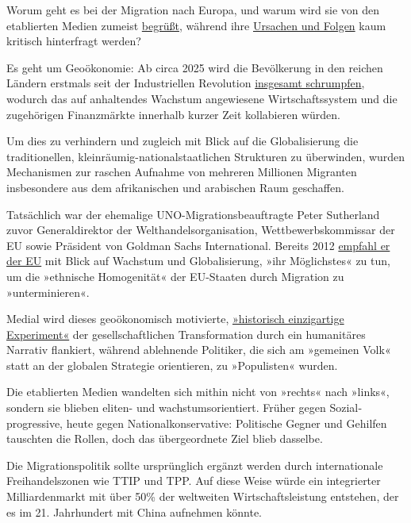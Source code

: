 Worum geht es bei der Migration nach Europa, und warum wird sie von den
etablierten Medien zumeist
\href{https://www.otto-brenner-stiftung.de/wissenschaftsportal/informationsseiten-zu-studien/studien-2017/die-fluechtlingskrise-in-den-medien/}{begrüßt},
während ihre
\href{https://www.heise.de/tp/features/Massenwanderungen-haben-sowohl-in-den-Herkunftslaendern-als-auch-den-Ziellaendern-der-Migranten-4205760.html?seite=all}{Ursachen
und Folgen} kaum kritisch hinterfragt werden?

Es geht um Geoökonomie: Ab circa 2025 wird die Bevölkerung in den
reichen Ländern erstmals seit der Industriellen Revolution
\href{https://econimica.blogspot.com/2019/07/2019-un-population-prospects-highlights.html}{insgesamt
schrumpfen}, wodurch das auf anhaltendes Wachstum angewiesene
Wirtschafts­system und die zugehörigen Finanzmärkte innerhalb kurzer
Zeit kollabieren würden.

Um dies zu verhindern und zugleich mit Blick auf die Globalisierung die
traditionellen, kleinräumig-national­­staatlichen Strukturen zu
überwinden, wurden Mechanismen zur raschen Aufnahme von mehreren
Millionen Migranten insbesondere aus dem afrikanischen und arabischen
Raum geschaffen.

Tatsächlich war der ehemalige UNO-Mi­gra­tions­beauftragte Peter
Sutherland zuvor Ge­ne­ral­di­rek­tor der Welt­handels­organisation,
Wett­be­werbs­kommissar der EU sowie Präsident von Goldman Sachs
Inter­na­tional. Bereits 2012
\href{https://de.wikipedia.org/wiki/Peter_Sutherland}{empfahl er der EU}
mit Blick auf Wachstum und Globalisierung, »ihr Möglichstes« zu tun, um
die »ethnische Homogenität« der EU-Staaten durch Migration zu
»unterminieren«.

Medial wird dieses geoökonomisch motivierte,
\href{https://www.youtube.com/watch?v=y9rVVYU-cS0\&t=1559}{»historisch
einzigartige Experiment«} der gesell­schaft­li­chen Transformation durch
ein humanitäres Narrativ flankiert, während ablehnende Politiker, die
sich am »gemeinen Volk« statt an der globalen Strategie orientieren, zu
»Populisten« wurden.

Die etablierten Medien wandelten sich mithin nicht von »rechts« nach
»links«, sondern sie blieben eliten- und wachstumsorientiert. Früher
gegen Sozial­progressive, heute gegen National­konservative:
Po­li­tische Gegner und Gehilfen tauschten die Rollen, doch das
übergeordnete Ziel blieb das­sel­be.

Die Migrationspolitik sollte ursprünglich ergänzt werden durch
internationale Frei­handels­zonen wie TTIP und TPP. Auf diese Weise
würde ein integrierter Milliardenmarkt mit über 50\% der weltweiten
Wirtschafts­leistung entstehen, der es im 21. Jahrhundert mit China
aufnehmen könnte.


